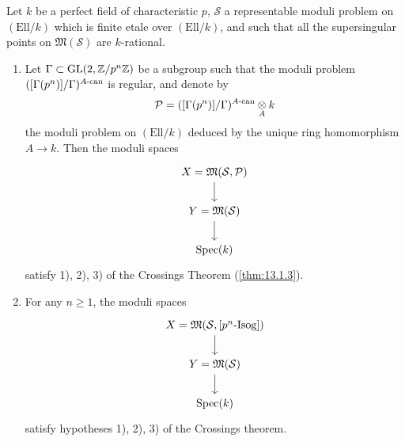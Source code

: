 \begin{kthm}\label{thm:13.2.2}
Let $k$ be a perfect field of characteristic $p$, $\mathcal{S}$ a representable moduli problem on $(\mathrm{Ell}/k)$ which is finite etale over $(\mathrm{Ell}/k)$, and such that all the supersingular points on $\mathfrak{M}(\mathcal{S})$ are $k$-rational.
\begin{enumerate}[label=\arabic*)]
\item Let $\Gamma \subset \operatorname{GL}(2, \mathbb{Z}/p^n\mathbb{Z})$ be a subgroup such that the moduli problem $([\Gamma(p^n)]/\Gamma)^{A\text{-\rm can}}$ is regular, and denote by
\[
\mathcal{P} = ([\Gamma(p^n)]/\Gamma)^{A\text{-\rm can}} \underset{A}{\otimes} k
\]
the moduli problem on $(\mathrm{Ell}/k)$ deduced by the unique ring homomorphism $A \to k$. Then the moduli spaces
\[
\begin{tikzcd}[row sep=1.8em]
X = \mathfrak{M}(\mathcal{S}, \mathcal{P}) \arrow[d] \\
Y = \mathfrak{M}(\mathcal{S}) \arrow[d] \\
\Spec(k)
\end{tikzcd}
\]
satisfy 1), 2), 3) of the Crossings Theorem (\ref{thm:13.1.3}).
\item For any $n \ge 1$, the moduli spaces
\[
\begin{tikzcd}[row sep=1.8em]
X = \mathfrak{M}(\mathcal{S}, [p^n\text{-\rm Isog}]) \arrow[d] \\
Y = \mathfrak{M}(\mathcal{S}) \arrow[d] \\
\Spec(k)
\end{tikzcd}
\]
satisfy hypotheses 1), 2), 3) of the Crossings theorem.
\end{enumerate}
\end{kthm}

